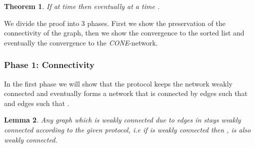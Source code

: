 \documentclass[11pt]{article}
\newtheorem{theorem}{Theorem}[section]
\newtheorem{lemma}[theorem]{Lemma}
\begin{document}
\begin{theorem}\label{theo:convergence}
If  at time  then eventually at a time  .
\end{theorem}

We divide the proof into 3 phases. First we show the preservation of the connectivity of the graph, then we show the convergence to the sorted list and eventually the convergence to the \emph{CONE}-network.

\subsubsection{Phase 1: Connectivity}
In the first phase we will show that the protocol keeps the network weakly connected and eventually forms a network that is connected by edges  such that  and edges  such that .

\begin{lemma}\label{lem:GConnectivity}
Any graph which is weakly connected due to edges in   stays weakly connected according to the given protocol, i.e if  is weakly connected then ,  is also weakly connected.
\end{lemma}
\end{document}
